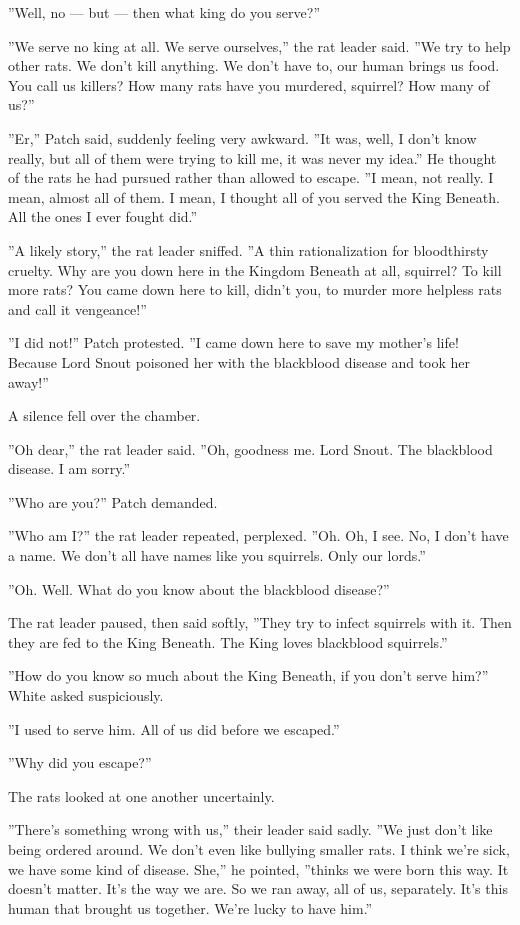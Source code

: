 \documentclass[12pt]{book}
\begin{document}
''Well, no ---
but ---
then what king do you serve?''

''We serve no king at all. We serve ourselves,'' the rat leader said. ''We try to help other rats. We don't kill anything. We don't have to, our human brings us food. You call us killers? How many rats have you murdered, squirrel? How many of us?''

''Er,'' Patch said, suddenly feeling very awkward. ''It was, well, I don't know really, but all of them were trying to kill me, it was never my idea.'' He thought of the rats he had pursued rather than allowed to escape. ''I mean, not really. I mean, almost all of them. I mean, I thought all of you served the King Beneath. All the ones I ever fought did.''

''A likely story,'' the rat leader sniffed. ''A thin rationalization for bloodthirsty cruelty. Why are you down here in the Kingdom Beneath at all, squirrel? To kill more rats? You came down here to kill, didn't you, to murder more helpless rats and call it vengeance!''

''I did not!'' Patch protested. ''I came down here to save my mother's life! Because Lord Snout poisoned her with the blackblood disease and took her away!''

A silence fell over the chamber.

''Oh dear,'' the rat leader said. ''Oh, goodness me. Lord Snout. The blackblood disease. I am sorry.''

''Who are you?'' Patch demanded.

''Who am I?'' the rat leader repeated, perplexed. ''Oh. Oh, I see. No, I don't have a name. We don't all have names like you squirrels. Only our lords.''

''Oh. Well. What do you know about the blackblood disease?''

The rat leader paused, then said softly, ''They try to infect squirrels with it. Then they are fed to the King Beneath. The King loves blackblood squirrels.''

''How do you know so much about the King Beneath, if you don't serve him?'' White asked suspiciously.

''I used to serve him. All of us did before we escaped.''

''Why did you escape?''

The rats looked at one another uncertainly.

''There's something wrong with us,'' their leader said sadly. ''We just don't like being ordered around. We don't even like bullying smaller rats. I think we're sick, we have some kind of disease. She,'' he pointed, ''thinks we were born this way. It doesn't matter. It's the way we are. So we ran away, all of us, separately. It's this human that brought us together. We're lucky to have him.''
\end{document}
